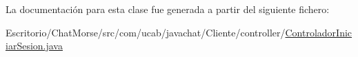 La documentación para esta clase fue generada a partir del siguiente fichero\-:\begin{DoxyCompactItemize}
\item 
Escritorio/\-Chat\-Morse/src/com/ucab/javachat/\-Cliente/controller/\hyperlink{_controlador_iniciar_sesion_8java}{Controlador\-Iniciar\-Sesion.\-java}\end{DoxyCompactItemize}
